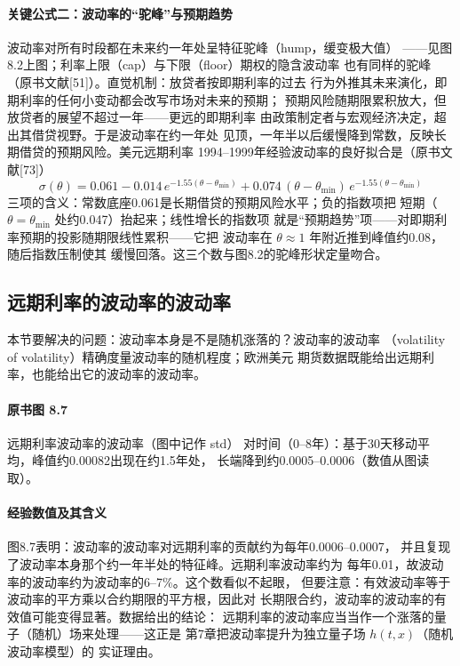 \paragraph{关键公式二：波动率的“驼峰”与预期趋势}
波动率对所有时段都在未来约一年处呈特征驼峰（hump，缓变极大值）
——见图8.2上图；利率上限（cap）与下限（floor）期权的隐含波动率
也有同样的驼峰（原书文献[51]）。直觉机制：放贷者按即期利率的过去
行为外推其未来演化，即期利率的任何小变动都会改写市场对未来的预期；
预期风险随期限累积放大，但放贷者的展望不超过一年——更远的即期利率
由政策制定者与宏观经济决定，超出其借贷视野。于是波动率在约一年处
见顶，一年半以后缓慢降到常数，反映长期借贷的预期风险。美元远期利率
1994--1999年经验波动率的良好拟合是（原书文献[73]）
\begin{equation*}
\sigma(\theta)=0.061-0.014\,e^{-1.55(\theta-\theta_{\min})}
+0.074\,(\theta-\theta_{\min})\,e^{-1.55(\theta-\theta_{\min})}
\tag{8.24}
\end{equation*}
三项的含义：常数底座0.061是长期借贷的预期风险水平；负的指数项把
短期（$\theta=\theta_{\min}$ 处约0.047）抬起来；线性增长的指数项
就是“预期趋势”项——对即期利率预期的投影随期限线性累积——它把
波动率在 $\theta\approx1$ 年附近推到峰值约0.08，随后指数压制使其
缓慢回落。这三个数与图8.2的驼峰形状定量吻合。

\subsection{远期利率的波动率的波动率}

本节要解决的问题：波动率本身是不是随机涨落的？波动率的波动率
（volatility of volatility）精确度量波动率的随机程度；欧洲美元
期货数据既能给出远期利率，也能给出它的波动率的波动率。

\paragraph{原书图 8.7}\quad 远期利率波动率的波动率（图中记作 std）
对时间（0--8年）：基于30天移动平均，峰值约0.00082出现在约1.5年处，
长端降到约0.0005--0.0006（数值从图读取）。

\paragraph{经验数值及其含义}
图8.7表明：波动率的波动率对远期利率的贡献约为每年0.0006--0.0007，
并且复现了波动率本身那个约一年半处的特征峰。远期利率波动率约为
每年0.01，故波动率的波动率约为波动率的6--7\%。这个数看似不起眼，
但要注意：有效波动率等于波动率的平方乘以合约期限的平方根，因此对
长期限合约，波动率的波动率的有效值可能变得显著。数据给出的结论：
远期利率的波动率应当当作一个涨落的量子（随机）场来处理——这正是
第7章把波动率提升为独立量子场 $h(t,x)$（随机波动率模型）的
实证理由。

